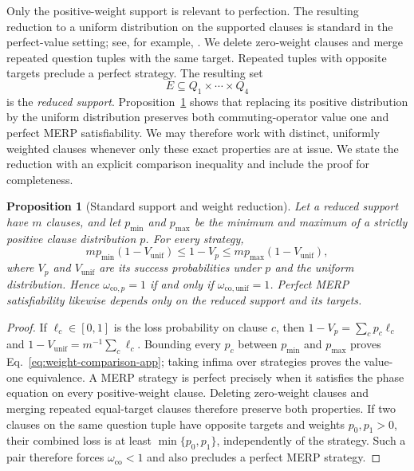 \documentclass[11pt]{article}
\newtheorem{proposition}[theorem]{Proposition}
\theoremstyle{definition}
\theoremstyle{remark}
\newcommand{\co}{\mathrm{co}}
\newcommand{\unif}{\mathrm{unif}}
\numberwithin{equation}{section}
\begin{document}
Only the positive-weight support is relevant to perfection.  The resulting
reduction to a uniform distribution on the supported clauses is standard in
the perfect-value setting; see, for example,
\cite[Sec.~2.1.1]{WattsHelton2023}.  We delete zero-weight clauses and merge
repeated question tuples with the same target.  Repeated tuples with opposite
targets preclude a perfect strategy.  The resulting set
\[
  E\subseteq Q_1\times\cdots\times Q_4
\]
is the \emph{reduced support}.  Proposition~\ref{prop:weight-reduction} shows
that replacing its positive distribution by the uniform distribution
preserves both commuting-operator value one and perfect MERP satisfiability.
We may therefore work with distinct, uniformly weighted clauses whenever
only these exact properties are at issue.  We state the reduction with an
explicit comparison inequality and include the proof for completeness.

\begin{proposition}[Standard support and weight reduction]
\label{prop:weight-reduction}
Let a reduced support have \(m\) clauses, and let \(p_{\min}\) and
\(p_{\max}\) be the minimum and maximum of a strictly positive clause
distribution \(p\).  For every strategy,
\begin{equation}\label{eq:weight-comparison-app}
 m p_{\min}(1-V_{\unif})
 \leq 1-V_p
 \leq m p_{\max}(1-V_{\unif}),
\end{equation}
where \(V_p\) and \(V_{\unif}\) are its success probabilities under \(p\)
and the uniform distribution.  Hence \(\omega_{\co,p}=1\) if and only if
\(\omega_{\co,\unif}=1\).  Perfect MERP satisfiability likewise depends
only on the reduced support and its targets.
\end{proposition}

\begin{proof}
If \(\ell_c\in[0,1]\) is the loss probability on clause \(c\), then
\(1-V_p=\sum_c p_c\ell_c\) and
\(1-V_{\unif}=m^{-1}\sum_c\ell_c\).  Bounding every \(p_c\) between
\(p_{\min}\) and \(p_{\max}\) proves Eq.~\eqref{eq:weight-comparison-app};
taking infima over strategies proves the value-one equivalence.  A MERP
strategy is perfect precisely when it satisfies the phase equation on every
positive-weight clause.  Deleting zero-weight clauses and merging repeated
equal-target clauses therefore preserve both properties.  If two clauses on
the same question tuple have opposite targets and weights \(p_0,p_1>0\),
their combined loss is at least \(\min\{p_0,p_1\}\), independently of the
strategy.  Such a pair therefore forces \(\omega_{\co}<1\) and also precludes
a perfect MERP strategy.
\end{proof}
\end{document}
